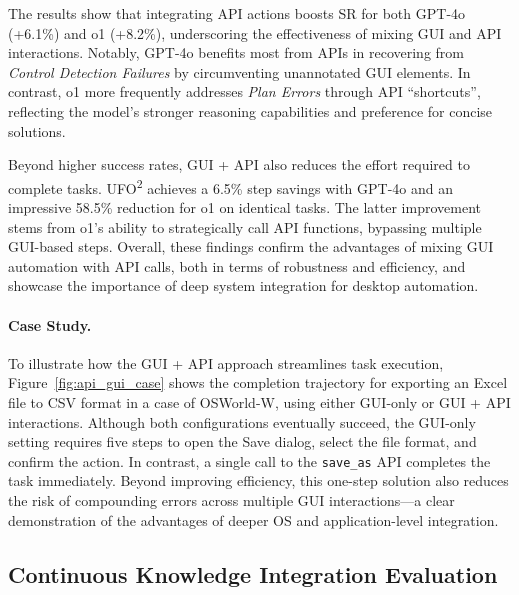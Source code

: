 \documentclass[sigplan,10pt]{acmart}
\newcommand{\name}{\textsc{UFO}\textsuperscript{2}\xspace}
\begin{document}
The results show that integrating API actions boosts SR for both GPT-4o (+6.1\%) and o1 (+8.2\%), underscoring the effectiveness of mixing GUI and API interactions. Notably, GPT-4o benefits most from APIs in recovering from \emph{Control Detection Failures} by circumventing unannotated GUI elements. In contrast, o1 more frequently addresses \emph{Plan Errors} through API ``shortcuts'', reflecting the model's stronger reasoning capabilities and preference for concise solutions.

Beyond higher success rates, GUI + API also reduces the effort required to complete tasks. \name achieves a 6.5\% step savings with GPT-4o and an impressive 58.5\% reduction for o1 on identical tasks. The latter improvement stems from o1's ability to strategically call API functions, bypassing multiple GUI-based steps. Overall, these findings confirm the advantages of mixing GUI automation with API calls, both in terms of robustness and efficiency, and showcase the importance of deep system integration for desktop automation.

\paragraph{Case Study.} To illustrate how the GUI + API approach streamlines task execution, Figure~\ref{fig:api_gui_case} shows the completion trajectory for exporting an Excel file to CSV format in a case of OSWorld-W, using either GUI-only or GUI + API interactions. Although both configurations eventually succeed, the GUI-only setting requires five steps to open the Save dialog, select the file format, and confirm the action. In contrast, a single call to the \texttt{save\_as} API completes the task immediately. Beyond improving efficiency, this one-step solution also reduces the risk of compounding errors across multiple GUI interactions—a clear demonstration of the advantages of deeper OS and application-level integration.

\subsection{Continuous Knowledge Integration Evaluation} \label{sec:knowledge_enhancement}
\end{document}
